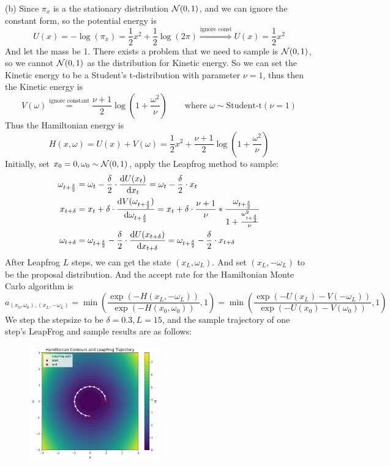 \begin{homeworkProblem}
(b) Since $\pi_x$ is a the stationary distribution $\mathcal{N}(0,1)$, and we can ignore the constant form, so the potential energy is
$$U(x)=-\log(\pi_x)=\dfrac{1}{2}x^2 + \dfrac{1}{2}\log(2\pi) \stackrel{\text{ignore const}}{\Rightarrow} U(x)=\dfrac{1}{2}x^2$$
And let the mass be 1. There exists a problem that we need to sample is $\mathcal{N}(0,1)$, so we cannot $\mathcal{N}(0,1)$ as the distribution for Kinetic energy. So we can set the Kinetic energy to be a Student's t-distribution with parameter $\nu=1$, thus then the Kinetic energy is
$$V(\omega)\stackrel{\text{ignore constant}}{=}\dfrac{\nu+1}{2}\log\left(1+\dfrac{\omega^2}{\nu}\right) \qquad\text{where } \omega\sim\text{Student-t}(\nu=1)$$
Thus the Hamiltonian energy is
$$H(x,\omega)=U(x)+V(\omega)=\dfrac{1}{2}x^2+\dfrac{\nu+1}{2}\log\left(1+\dfrac{\omega^2}{\nu}\right)$$
Initially, set $x_0=0, \omega_0\sim\mathcal{N}(0,1)$, apply the Leapfrog method to sample:
\begin{align*}
\omega_{t+\frac{\delta}{2}} &= \omega_t - \frac{\delta}{2}\cdot \dfrac{\mathrm{d}U(x_t)}{\mathrm{d}x_t} = \omega_t - \frac{\delta}{2}\cdot x_t \\
x_{t+\delta} &= x_t + \delta \cdot \dfrac{\mathrm{d}V(\omega_{t+\frac{\delta}{2}})}{\mathrm{d}\omega_{t+\frac{\delta}{2}}} = x_t + \delta\cdot \dfrac{\nu + 1}{\nu} * \dfrac{\omega_{t+\frac{\delta}{2}}}{1 + \frac{\omega_{t+\frac{\delta}{2}}^2}{\nu}} \\
\omega_{t+\delta} &= \omega_{t+\frac{\delta}{2}} - \frac{\delta}{2}\cdot \dfrac{\mathrm{d}U(x_{t+\delta})}{\mathrm{d}x_{t+\delta}} = \omega_{t+\frac{\delta}{2}} - \frac{\delta}{2}\cdot x_{t+\delta}
\end{align*}
After Leapfrog $L$ steps, we can get the state $(x_L, \omega_L)$. And set $(x_L, -\omega_L)$ to be the proposal distribution. And the accept rate for the Hamiltonian Monte Carlo algorithm is
$$a_{(x_0,\omega_0),(x_L,-\omega_L)}=\min\left(\dfrac{\exp\left(-H(x_L,-\omega_L)\right)}{\exp\left(-H(x_0,\omega_0)\right)}, 1\right)=\min\left(\dfrac{\exp\left(-U(x_L)-V(-\omega_L)\right)}{\exp\left(-U(x_0)-V(\omega_0)\right)}, 1\right)$$
We step the stepsize to be $\delta=0.3, L=15$, and the sample trajectory of one step's LeapFrog and sample results are as follows:
\begin{figure}[h]
    \centering
    \includegraphics[width=0.5\textwidth]{./figure/p4/trajectory.png}

\end{figure}
\end{homeworkProblem}
